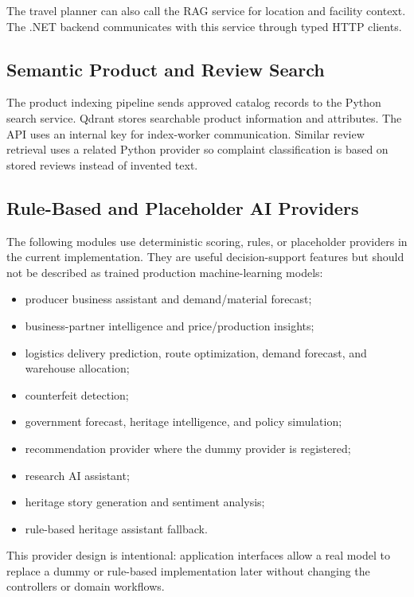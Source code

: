 \documentclass[12pt,a4paper]{report}
\begin{document}
The travel planner can also call the RAG service for location and facility context. The .NET backend communicates with this service through typed HTTP clients.

\subsection{Semantic Product and Review Search}

The product indexing pipeline sends approved catalog records to the Python search service. Qdrant stores searchable product information and attributes. The API uses an internal key for index-worker communication. Similar review retrieval uses a related Python provider so complaint classification is based on stored reviews instead of invented text.

\subsection{Rule-Based and Placeholder AI Providers}

The following modules use deterministic scoring, rules, or placeholder providers in the current implementation. They are useful decision-support features but should not be described as trained production machine-learning models:

\begin{itemize}
  \item producer business assistant and demand/material forecast;
  \item business-partner intelligence and price/production insights;
  \item logistics delivery prediction, route optimization, demand forecast, and warehouse allocation;
  \item counterfeit detection;
  \item government forecast, heritage intelligence, and policy simulation;
  \item recommendation provider where the dummy provider is registered;
  \item research AI assistant;
  \item heritage story generation and sentiment analysis;
  \item rule-based heritage assistant fallback.
\end{itemize}

This provider design is intentional: application interfaces allow a real model to replace a dummy or rule-based implementation later without changing the controllers or domain workflows.
\end{document}
